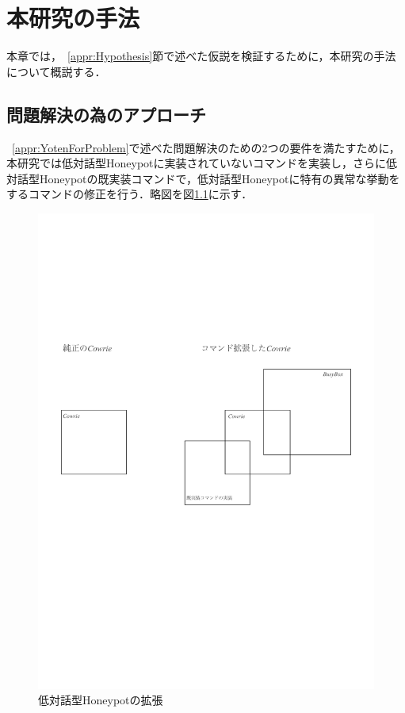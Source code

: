\chapter{本研究の手法}
\label{meth}

本章では，~\ref{appr:Hypothesis}節で述べた仮説を検証するために，本研究の手法について概説する．

\section{問題解決の為のアプローチ}
\label{meth:appr}
 ~\ref{appr:YotenForProblem}で述べた問題解決のための2つの要件を満たすために，本研究では低対話型Honeypotに実装されていないコマンドを実装し，さらに低対話型Honeypotの既実装コマンドで，低対話型Honeypotに特有の異常な挙動をするコマンドの修正を行う．略図を図\ref{fig:addcommand}に示す．

\vspace{10mm}
\begin{figure}[htbp]
    \centering
    \includegraphics[width=1.0\textwidth]{figures/addcommand.pdf}
    \caption{低対話型Honeypotの拡張}
    \label{fig:addcommand}
\end{figure}
\vspace{10mm}

